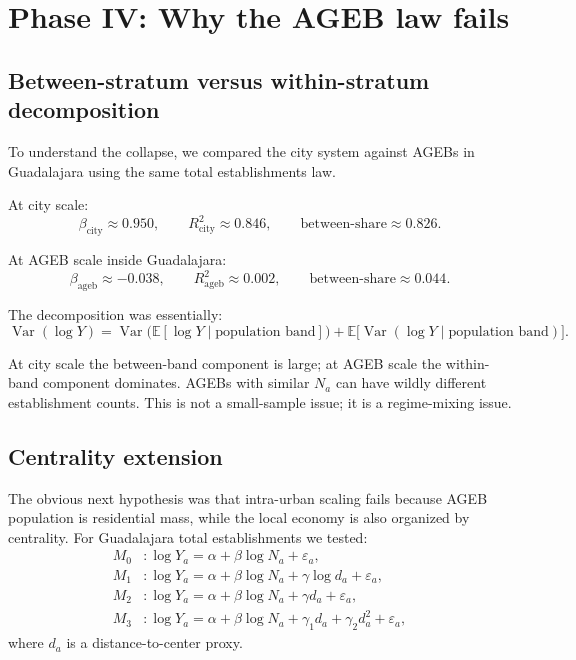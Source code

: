 \documentclass[11pt]{article}
\newcommand{\E}{\mathbb{E}}
\newcommand{\Var}{\operatorname{Var}}
\begin{document}
\section{Phase IV: Why the AGEB law fails}

\subsection{Between-stratum versus within-stratum decomposition}

To understand the collapse, we compared the city system against AGEBs in Guadalajara using the same total establishments law.

At city scale:
\begin{equation}
\beta_{\mathrm{city}} \approx 0.950,
\qquad
R^2_{\mathrm{city}} \approx 0.846,
\qquad
\text{between-share} \approx 0.826.
\end{equation}

At AGEB scale inside Guadalajara:
\begin{equation}
\beta_{\mathrm{ageb}} \approx -0.038,
\qquad
R^2_{\mathrm{ageb}} \approx 0.002,
\qquad
\text{between-share} \approx 0.044.
\end{equation}

The decomposition was essentially:
\begin{equation}
\Var(\log Y)
=
\Var\!\bigl(\E[\log Y \mid \text{population band}]\bigr)
+
\E\!\bigl[\Var(\log Y \mid \text{population band})\bigr].
\end{equation}

At city scale the between-band component is large; at AGEB scale the within-band component dominates. AGEBs with similar \(N_a\) can have wildly different establishment counts. This is not a small-sample issue; it is a regime-mixing issue.

\subsection{Centrality extension}

The obvious next hypothesis was that intra-urban scaling fails because AGEB population is residential mass, while the local economy is also organized by centrality. For Guadalajara total establishments we tested:
\begin{align}
M_0 &: \log Y_a = \alpha + \beta \log N_a + \varepsilon_a,\\
M_1 &: \log Y_a = \alpha + \beta \log N_a + \gamma \log d_a + \varepsilon_a,\\
M_2 &: \log Y_a = \alpha + \beta \log N_a + \gamma d_a + \varepsilon_a,\\
M_3 &: \log Y_a = \alpha + \beta \log N_a + \gamma_1 d_a + \gamma_2 d_a^2 + \varepsilon_a,
\end{align}
where \(d_a\) is a distance-to-center proxy.
\end{document}
